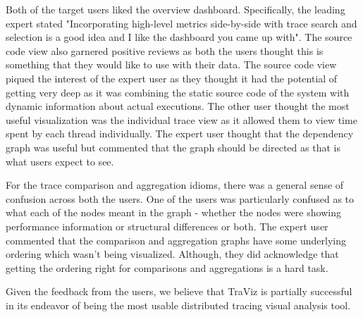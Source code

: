 Both of the target users liked the overview dashboard. Specifically, the leading expert
stated "Incorporating high-level metrics side-by-side with trace search and selection is a good idea and I like the dashboard you came 
up with". The source code view also garnered positive reviews as both the users thought
this is something that they would like to use with their data. The source code view
piqued the interest of the expert user as they thought it had the potential of getting
very deep as it was combining the static source code of the system with dynamic information
about actual executions. The other user thought the most useful visualization was the individual
trace view as it allowed them to view time spent by each thread individually.
The expert user thought that the dependency graph was useful but commented that
the graph should be directed as that is what users expect to see.

For the trace comparison and aggregation idioms, there was a general sense of confusion
across both the users. One of the users was particularly confused as to what each
of the nodes meant in the graph - whether the nodes were showing performance information
or structural differences or both. The expert user commented that the comparison and aggregation
graphs have some underlying ordering which wasn't being visualized. Although, they did acknowledge
that getting the ordering right for comparisons and aggregations is a hard task.

Given the feedback from the users, we believe that TraViz is partially successful in its endeavor of
being the most usable distributed tracing visual analysis tool.